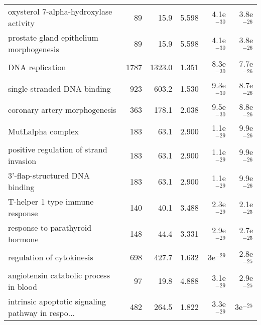 \begin{longtable}{lrrrrr}
            oxysterol 7-alpha-hydroxylase activity &                      89 &                    15.9 &      5.598 &         4.1e$^{-30}$ &         3.8e$^{-26}$ \\
           prostate gland epithelium morphogenesis &                      89 &                    15.9 &      5.598 &         4.1e$^{-30}$ &         3.8e$^{-26}$ \\
                                   DNA replication &                    1787 &                  1323.0 &      1.351 &         8.3e$^{-30}$ &         7.7e$^{-26}$ \\
                       single-stranded DNA binding &                     923 &                   603.2 &      1.530 &         9.3e$^{-30}$ &         8.7e$^{-26}$ \\
                     coronary artery morphogenesis &                     363 &                   178.1 &      2.038 &         9.5e$^{-30}$ &         8.8e$^{-26}$ \\
                                 MutLalpha complex &                     183 &                    63.1 &      2.900 &         1.1e$^{-29}$ &         9.9e$^{-26}$ \\
            positive regulation of strand invasion &                     183 &                    63.1 &      2.900 &         1.1e$^{-29}$ &         9.9e$^{-26}$ \\
                    3'-flap-structured DNA binding &                     183 &                    63.1 &      2.900 &         1.1e$^{-29}$ &         9.9e$^{-26}$ \\
                   T-helper 1 type immune response &                     140 &                    40.1 &      3.488 &         2.3e$^{-29}$ &         2.1e$^{-25}$ \\
                   response to parathyroid hormone &                     148 &                    44.4 &      3.331 &         2.9e$^{-29}$ &         2.7e$^{-25}$ \\
                         regulation of cytokinesis &                     698 &                   427.7 &      1.632 &           3e$^{-29}$ &         2.8e$^{-25}$ \\
            angiotensin catabolic process in blood &                      97 &                    19.8 &      4.888 &         3.1e$^{-29}$ &         2.9e$^{-25}$ \\
 intrinsic apoptotic signaling pathway in respo... &                     482 &                   264.5 &      1.822 &         3.3e$^{-29}$ &           3e$^{-25}$ \\

\end{longtable}
